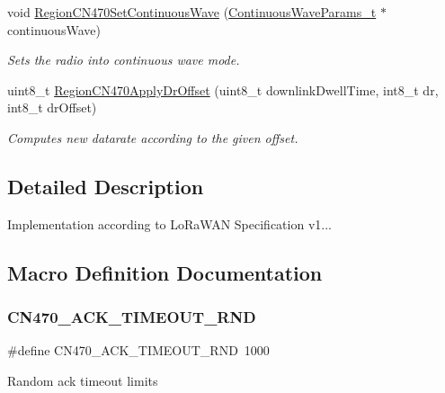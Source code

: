 \begin{DoxyCompactItemize}
void \hyperlink{group__REGIONCN470_ga0a1e509012a913631470e9801cc972bd}{Region\+C\+N470\+Set\+Continuous\+Wave} (\hyperlink{group__REGION_gaf39bb5ba06921139c6d17f88a8d518cd}{Continuous\+Wave\+Params\+\_\+t} $\ast$continuous\+Wave)
\begin{DoxyCompactList}\small\item\em Sets the radio into continuous wave mode. \end{DoxyCompactList}\item 
uint8\+\_\+t \hyperlink{group__REGIONCN470_ga9b7086c4eb616fb332a95f05845aac89}{Region\+C\+N470\+Apply\+Dr\+Offset} (uint8\+\_\+t downlink\+Dwell\+Time, int8\+\_\+t dr, int8\+\_\+t dr\+Offset)
\begin{DoxyCompactList}\small\item\em Computes new datarate according to the given offset. \end{DoxyCompactList}\end{DoxyCompactItemize}


\subsection{Detailed Description}
Implementation according to Lo\+Ra\+W\+AN Specification v1... 

\subsection{Macro Definition Documentation}
\mbox{\label{group__REGIONCN470_ga020ad82ebe368189c51b4d21a7b5596d}} 
\subsubsection{\texorpdfstring{C\+N470\+\_\+\+A\+C\+K\+\_\+\+T\+I\+M\+E\+O\+U\+T\+\_\+\+R\+ND}{CN470\_ACK\_TIMEOUT\_RND}}
{\footnotesize\ttfamily \#define C\+N470\+\_\+\+A\+C\+K\+\_\+\+T\+I\+M\+E\+O\+U\+T\+\_\+\+R\+ND~1000}

Random ack timeout limits \mbox{\label{group__REGIONCN470_gac4bc7c6dea1ebeb1cfe0e9a0ecb0db72}} 
